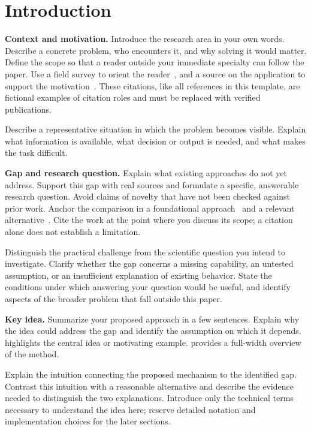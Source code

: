 \section{Introduction}
\label{sec:introduction}
\textbf{Context and motivation.}
Introduce the research area in your own words. Describe a concrete problem,
who encounters it, and why solving it would matter. Define the scope so that
a reader outside your immediate specialty can follow the paper.
Use a field survey to orient the reader~\cite{survey}, and a source on the
application to support the motivation~\cite{application}. These citations,
like all references in this template, are fictional examples of citation
roles and must be replaced with verified publications.

Describe a representative situation in which the problem becomes visible.
Explain what information is available, what decision or output is needed,
and what makes the task difficult.

\textbf{Gap and research question.}
Explain what existing approaches do not yet address. Support this gap with
real sources and formulate a specific, answerable research question.
Avoid claims of novelty that have not been checked against prior work.
Anchor the comparison in a foundational approach~\cite{foundational} and
a relevant alternative~\cite{alternative}. Cite the work at the point where
you discuss its scope; a citation alone does not establish a limitation.

Distinguish the practical challenge from the scientific question you intend
to investigate. Clarify whether the gap concerns a missing capability, an
untested assumption, or an insufficient explanation of existing behavior.
State the conditions under which answering your question would be useful,
and identify aspects of the broader problem that fall outside this paper.

\textbf{Key idea.}
Summarize your proposed approach in a few sentences. Explain why the idea
could address the gap and identify the assumption on which it depends.
 highlights the central idea or motivating example.
 provides a full-width overview of the method.

Explain the intuition connecting the proposed mechanism to the identified
gap. Contrast this intuition with a reasonable alternative and describe the
evidence needed to distinguish the two explanations. Introduce only the
technical terms necessary to understand the idea here; reserve detailed
notation and implementation choices for the later sections.

